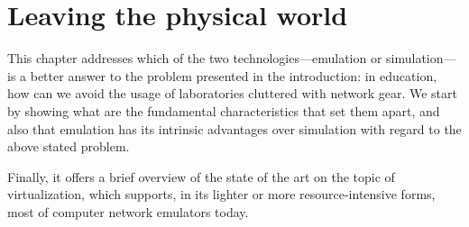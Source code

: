
\chapter{Leaving the physical world}
\label{ch:leavingthephysicalworld}

This chapter addresses which of the two technologies---emulation or simulation---is a better answer to the problem presented in the introduction:
in education, how can we avoid the usage of laboratories cluttered with network gear.
We start by showing what are the fundamental characteristics that set them apart, and also that emulation has its intrinsic advantages over simulation with regard to the above stated problem.

Finally, it offers a brief overview of the state of the art on the topic of virtualization, which supports, in its lighter or more resource-intensive forms, most of computer network emulators today.





